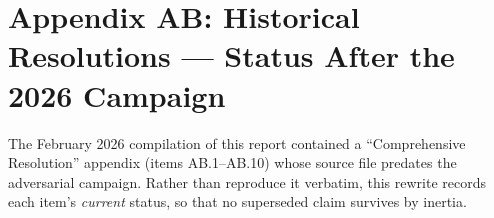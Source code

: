 \section{Appendix AB: Historical Resolutions --- Status After the 2026 Campaign}
\label{app:AB}

The February 2026 compilation of this report contained a ``Comprehensive Resolution''
appendix (items AB.1--AB.10) whose source file predates the adversarial campaign. Rather than
reproduce it verbatim, this rewrite records each item's \emph{current} status, so that no
superseded claim survives by inertia.

